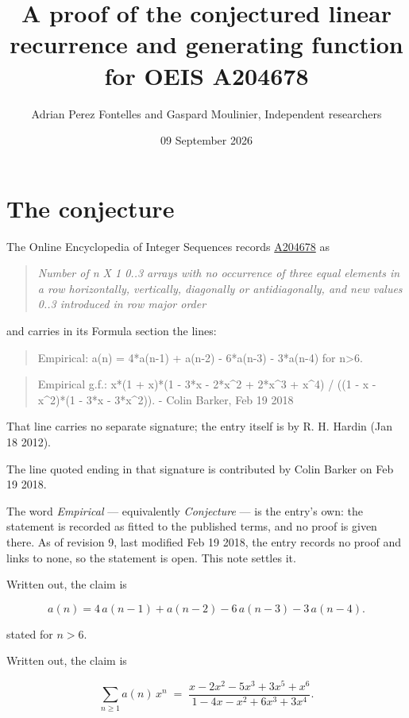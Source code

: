 \documentclass[11pt]{article}
\title{A proof of the conjectured linear recurrence and generating function for OEIS A204678}
\author{Adrian Perez Fontelles and Gaspard Moulinier, Independent researchers}
\date{09 September 2026}
\theoremstyle{definition}
\begin{document}
\maketitle
\section{The conjecture}

The Online Encyclopedia of Integer Sequences records \href{https://oeis.org/A204678}{A204678} as

\begin{quote}\itshape Number of n X 1 0..3 arrays with no occurrence of three equal elements in a row horizontally, vertically, diagonally or antidiagonally, and new values 0..3 introduced in row major order\end{quote}

and carries in its Formula section the lines:

\begin{quote}\ttfamily Empirical: a(n) = 4*a(n-1) + a(n-2) - 6*a(n-3) - 3*a(n-4) for n>6.\end{quote}

\begin{quote}\ttfamily Empirical g.f.: x*(1 + x)*(1 - 3*x - 2*x\textasciicircum{}2 + 2*x\textasciicircum{}3 + x\textasciicircum{}4) / ((1 - x - x\textasciicircum{}2)*(1 - 3*x - 3*x\textasciicircum{}2)). - Colin Barker, Feb 19 2018\end{quote}

That line carries no separate signature; the entry itself is by R. H. Hardin (Jan 18 2012).

The line quoted ending in that signature is contributed by Colin Barker on Feb 19 2018.

The word {\itshape Empirical} --- equivalently {\itshape Conjecture} --- is the entry's own: the statement is recorded as fitted to the published terms, and no proof is given there. As of revision 9, last modified Feb 19 2018, the entry records no proof and links to none, so the statement is open. This note settles it.

Written out, the claim is

\[a(n) = 4\,a(n-1) + a(n-2) - 6\,a(n-3) - 3\,a(n-4).\]

stated for $n > 6$.

Written out, the claim is

\[\sum_{n \ge 1} a(n)\,x^n \;=\; \frac{x - 2x^{2} - 5x^{3} + 3x^{5} + x^{6}}{1 - 4x - x^{2} + 6x^{3} + 3x^{4}}.\]
\end{document}
